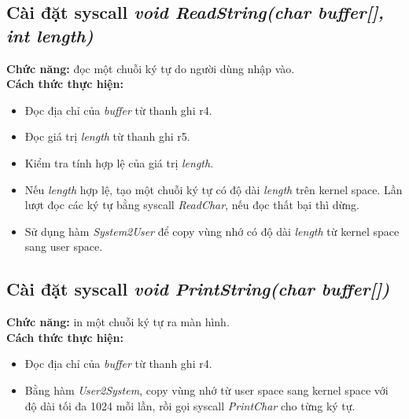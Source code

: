 \subsection{Cài đặt syscall \textit{void ReadString(char buffer[], int length)}}
\textbf{Chức năng:} đọc một chuỗi ký tự do người dùng nhập vào.\\
\textbf{Cách thức thực hiện:}
\begin{itemize}
\item Đọc địa chỉ của \textit{buffer} từ thanh ghi r4.
\item Đọc giá trị \textit{length} từ thanh ghi r5.
\item Kiểm tra tính hợp lệ của giá trị \textit{length}.
\item Nếu \textit{length} hợp lệ, tạo một chuỗi ký tự có độ dài \textit{length} trên kernel space. Lần lượt đọc các ký tự bằng syscall \textit{ReadChar}, nếu đọc thất bại thì dừng.
\item Sử dụng hàm \textit{System2User} để copy vùng nhớ có độ dài \textit{length} từ kernel space sang user space.
\end{itemize}

\subsection{Cài đặt syscall \textit{void PrintString(char buffer[])}}
\textbf{Chức năng:} in một chuỗi ký tự ra màn hình.\\
\textbf{Cách thức thực hiện:}
\begin{itemize}
\item Đọc địa chỉ của \textit{buffer} từ thanh ghi r4.
\item Bằng hàm \textit{User2System}, copy vùng nhớ từ user space sang kernel space với độ dài tối đa 1024 mỗi lần, rồi gọi syscall \textit{PrintChar} cho từng ký tự.
\end{itemize}